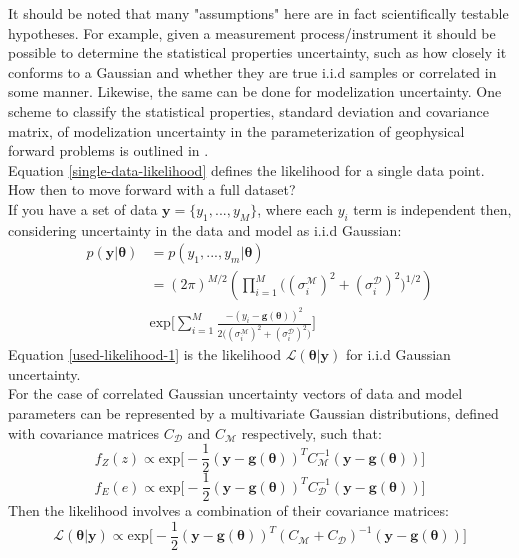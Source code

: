 \begin{tcolorbox}[enhanced jigsaw,breakable,pad at break*=1mm,title=Technical figure 2: Applied likelihood derivation, title filled,fonttitle=\sffamily\bfseries,fontupper=\sffamily\scriptsize]
\begin{multicols}{2}
It should be noted that many "assumptions" here are in fact scientifically testable hypotheses. For example, given a measurement process/instrument it should be possible to determine the statistical properties uncertainty, such as how closely it conforms to a Gaussian and whether they are true i.i.d samples or correlated in some manner. Likewise, the same can be done for modelization uncertainty. One scheme to classify the statistical properties, standard deviation and covariance matrix, of modelization uncertainty in the parameterization of geophysical forward problems is outlined in \citet{afonso2013b}.\\

Equation \ref{single-data-likelihood} defines the likelihood for a single data point. How then to move forward with a full dataset?\\

If you have a set of data $\bm{y} = \{y_1,...,y_M\}$, where each $y_i$ term is independent then, considering uncertainty in the data and model as i.i.d Gaussian:
\begin{equation}
\begin{split}
p(\bm{y}|\bm{\theta}) &= p(y_1,...,y_m|\bm{\theta})\\
&= (2\pi)^{M/2}(\prod_{i = 1}^{M}\big((\sigma^{\mathcal{M}}_i)^2+(\sigma^{\mathcal{D}}_i)^2\big)^{1/2})\\ 
& \text{exp}\bigg[\sum_{i = 1}^{M}\frac{-(y_i-\bm{g}({\bm{\theta}}))^2}{2\big((\sigma^{\mathcal{M}}_i)^2+(\sigma^{\mathcal{D}}_i)^2\big)}\bigg]
\label{used-likelihood-1}
\end{split}
\end{equation}
Equation \ref{used-likelihood-1} is the likelihood $\mathcal{L}(\bm{\theta}|\bm{y})$ for i.i.d Gaussian uncertainty.\\ 

For the case of correlated Gaussian uncertainty vectors of data and model parameters can be represented by a multivariate Gaussian distributions, defined with covariance matrices $C_{\mathcal{D}}$ and $C_{\mathcal{M}}$ respectively, such that:
\begin{equation}
f_Z(z) \propto \text{exp}\bigg[-\frac{1}{2}(\bm{y}-\bm{g}(\bm{\theta}))^TC_{\mathcal{M}}^{-1}(\bm{y}-\bm{g}(\bm{\theta}))\bigg]
\end{equation}
\begin{equation}
f_E(e) \propto \text{exp}\bigg[-\frac{1}{2}(\bm{y}-\bm{g}(\bm{\theta}))^TC_{\mathcal{D}}^{-1}(\bm{y}-\bm{g}(\bm{\theta}))\bigg]
\end{equation}
Then the likelihood involves a combination of their covariance matrices:
\begin{equation}
\mathcal{L}(\bm{\theta}|\bm{y}) \propto \text{exp}\bigg[-\frac{1}{2}(\bm{y}-\bm{g}(\bm{\theta}))^T(C_{\mathcal{M}}+C_{\mathcal{D}})^{-1}(\bm{y}-\bm{g}(\bm{\theta}))\bigg]
\label{used-likelihood-2}
\end{equation}


\end{multicols}
\end{tcolorbox}
